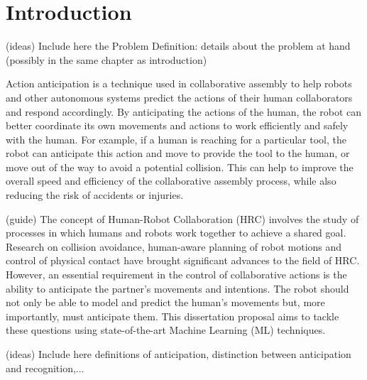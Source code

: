 \chapter{Introduction}
\label{chapter:introduction}


{\color{red}
(ideas) Include here the Problem Definition: details about the problem at hand (possibly in the same chapter as introduction)
}

{\color{red}
Action anticipation is a technique used in collaborative assembly to help robots and other autonomous systems predict the actions of their human collaborators and respond accordingly. By anticipating the actions of the human, the robot can better coordinate its own movements and actions to work efficiently and safely with the human. For example, if a human is reaching for a particular tool, the robot can anticipate this action and move to provide the tool to the human, or move out of the way to avoid a potential collision. This can help to improve the overall speed and efficiency of the collaborative assembly process, while also reducing the risk of accidents or injuries.
}

{\color{red}
(guide) The concept of Human-Robot Collaboration (HRC) involves the study of processes in which humans and robots work together to achieve a shared goal. Research on collision avoidance, human-aware planning of robot motions and control of physical contact have brought significant advances to the field of HRC. However, an essential requirement in the control of collaborative actions is the ability to anticipate the partner’s movements and intentions. The robot should not only be able to model and predict the human’s movements but, more importantly, must anticipate them. This dissertation proposal aims to tackle these questions using state-of-the-art Machine Learning (ML) techniques.
}

{\color{red}
(ideas) Include here definitions of anticipation, distinction between anticipation and recognition,...
}


